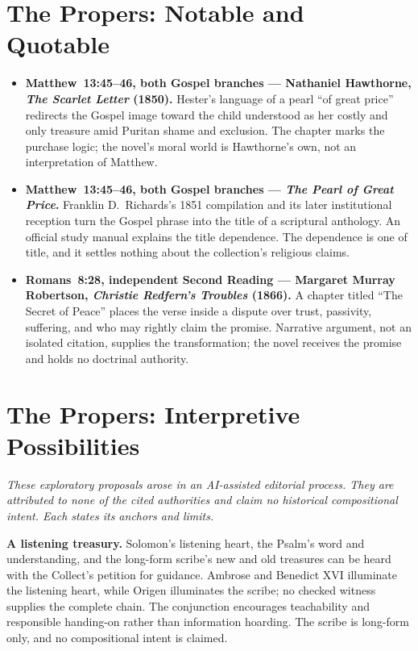 \newcommand{\TriptychNotableAndQuotable}{%
\sectionguard
\section*{The Propers: Notable and Quotable}

{\small
\begin{itemize}[itemsep=0.35em,topsep=0.2em,parsep=0pt]
\item \textbf{Matthew~13:45--46, both Gospel branches --- Nathaniel Hawthorne, \emph{The Scarlet Letter} (1850).} Hester's language of a pearl ``of great price'' redirects the Gospel image toward the child understood as her costly and only treasure amid Puritan shame and exclusion. The chapter marks the purchase logic; the novel's moral world is Hawthorne's own, not an interpretation of Matthew.

\item \textbf{Matthew~13:45--46, both Gospel branches --- \emph{The Pearl of Great Price}.} Franklin D.~Richards's 1851 compilation and its later institutional reception turn the Gospel phrase into the title of a scriptural anthology. An official study manual explains the title dependence. The dependence is one of title, and it settles nothing about the collection's religious claims.

\item \textbf{Romans~8:28, independent Second Reading --- Margaret Murray Robertson, \emph{Christie Redfern's Troubles} (1866).} A chapter titled ``The Secret of Peace'' places the verse inside a dispute over trust, passivity, suffering, and who may rightly claim the promise. Narrative argument, not an isolated citation, supplies the transformation; the novel receives the promise and holds no doctrinal authority.

\end{itemize}
}
}
\TriptychNotableAndQuotable

\sectionguard
\section*{The Propers: Interpretive Possibilities}

\noindent\emph{These exploratory proposals arose in an AI-assisted editorial process. They are attributed to none of the cited authorities and claim no historical compositional intent. Each states its anchors and limits.}

\begingroup
\footnotesize
{}
\noindent\textbf{A listening treasury.\enspace{}}
Solomon's listening heart, the Psalm's word and understanding, and the long-form scribe's new and old treasures can be heard with the Collect's petition for guidance. Ambrose and Benedict XVI illuminate the listening heart, while Origen illuminates the scribe; no checked witness supplies the complete chain. The conjunction encourages teachability and responsible handing-on rather than information hoarding. The scribe is long-form only, and no compositional intent is claimed.

